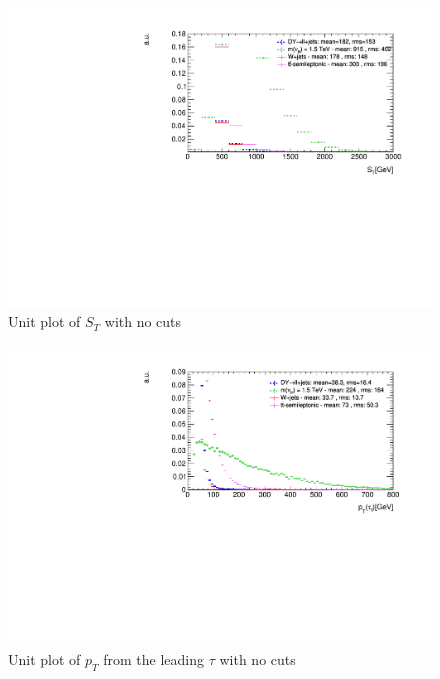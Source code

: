 \begin{figure}
\centering
\includegraphics[width=1.2\linewidth]{Figures/Plots/ST_unitNoCuts}
\caption{Unit plot of $S_{T}$ with no cuts}
\label{fig: STunitNC}
\end{figure}

\begin{figure}[H]
\centering
\includegraphics[width=1.2\linewidth]{Figures/Plots/tau1_pT_unitNoCuts}
\caption{Unit plot of $p_{T}$ from the leading $\tau$ with no cuts}
\label{fig: tau1pTunitNC}
\end{figure}
